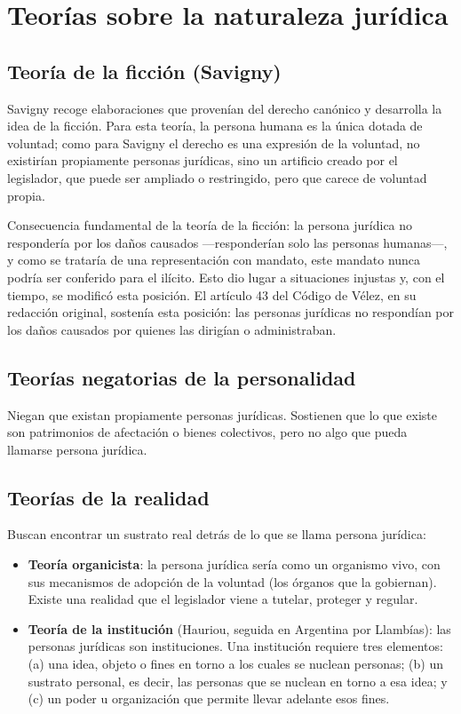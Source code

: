 \documentclass[12pt,oneside]{book}
\begin{document}
\section{Teorías sobre la naturaleza jurídica}

\subsection{Teoría de la ficción (Savigny)}

Savigny recoge elaboraciones que provenían del derecho canónico y desarrolla la idea de la ficción. Para esta teoría, la persona humana es la única dotada de voluntad; como para Savigny el derecho es una expresión de la voluntad, no existirían propiamente personas jurídicas, sino un artificio creado por el legislador, que puede ser ampliado o restringido, pero que carece de voluntad propia.

\begin{important}
Consecuencia fundamental de la teoría de la ficción: la persona jurídica no respondería por los daños causados —responderían solo las personas humanas—, y como se trataría de una representación con mandato, este mandato nunca podría ser conferido para el ilícito. Esto dio lugar a situaciones injustas y, con el tiempo, se modificó esta posición. El artículo 43 del Código de Vélez, en su redacción original, sostenía esta posición: las personas jurídicas no respondían por los daños causados por quienes las dirigían o administraban.
\end{important}

\subsection{Teorías negatorias de la personalidad}

Niegan que existan propiamente personas jurídicas. Sostienen que lo que existe son patrimonios de afectación o bienes colectivos, pero no algo que pueda llamarse persona jurídica.

\subsection{Teorías de la realidad}

Buscan encontrar un sustrato real detrás de lo que se llama persona jurídica:

\begin{itemize}
    \item \textbf{Teoría organicista}: la persona jurídica sería como un organismo vivo, con sus mecanismos de adopción de la voluntad (los órganos que la gobiernan). Existe una realidad que el legislador viene a tutelar, proteger y regular.
    \item \textbf{Teoría de la institución} (Hauriou, seguida en Argentina por Llambías): las personas jurídicas son instituciones. Una institución requiere tres elementos: (a) una idea, objeto o fines en torno a los cuales se nuclean personas; (b) un sustrato personal, es decir, las personas que se nuclean en torno a esa idea; y (c) un poder u organización que permite llevar adelante esos fines.
\end{itemize}
\end{document}
